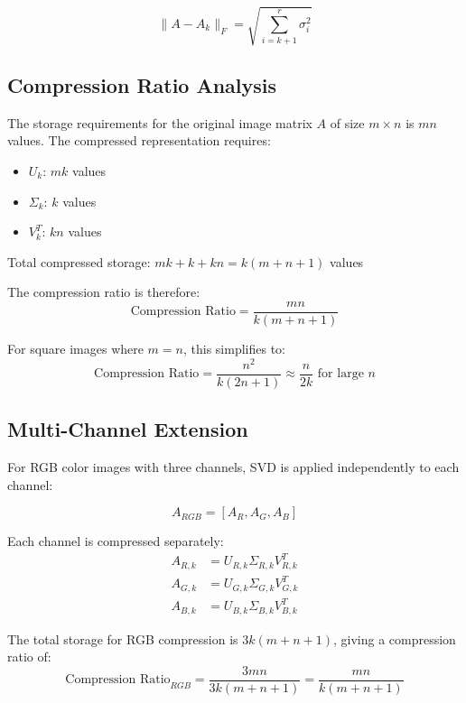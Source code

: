 \documentclass[12pt,a4paper]{article}
\begin{document}
\begin{equation}
\|A - A_k\|_F = \sqrt{\sum_{i=k+1}^{r} \sigma_i^2}
\end{equation}

\subsection{Compression Ratio Analysis}

The storage requirements for the original image matrix $A$ of size $m \times n$ is $mn$ values. The compressed representation requires:
\begin{itemize}
    \item $U_k$: $mk$ values
    \item $\Sigma_k$: $k$ values  
    \item $V_k^T$: $kn$ values
\end{itemize}

Total compressed storage: $mk + k + kn = k(m + n + 1)$ values

The compression ratio is therefore:
\begin{equation}
\text{Compression Ratio} = \frac{mn}{k(m + n + 1)}
\end{equation}

For square images where $m = n$, this simplifies to:
\begin{equation}
\text{Compression Ratio} = \frac{n^2}{k(2n + 1)} \approx \frac{n}{2k} \text{ for large } n
\end{equation}

\subsection{Multi-Channel Extension}

For RGB color images with three channels, SVD is applied independently to each channel:

\begin{equation}
A_{RGB} = [A_R, A_G, A_B]
\end{equation}

Each channel is compressed separately:
\begin{align}
A_{R,k} &= U_{R,k}\Sigma_{R,k}V_{R,k}^T \\
A_{G,k} &= U_{G,k}\Sigma_{G,k}V_{G,k}^T \\
A_{B,k} &= U_{B,k}\Sigma_{B,k}V_{B,k}^T
\end{align}

The total storage for RGB compression is $3k(m + n + 1)$, giving a compression ratio of:
\begin{equation}
\text{Compression Ratio}_{RGB} = \frac{3mn}{3k(m + n + 1)} = \frac{mn}{k(m + n + 1)}
\end{equation}
\end{document}

